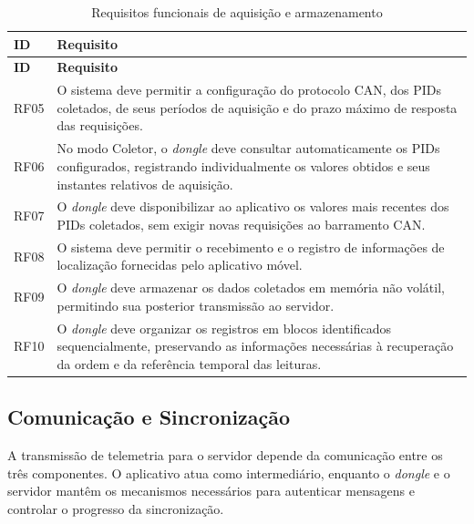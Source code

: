 \begin{longtable}{p{}p{}}
\caption{Requisitos funcionais de aquisição e armazenamento}
\label{tab:rf-coleta}\\
\hline
\textbf{ID} & \textbf{Requisito} \\
\hline
\endfirsthead

\hline
\textbf{ID} & \textbf{Requisito} \\
\hline
\endhead

RF05 & O sistema deve permitir a configuração do protocolo CAN,
dos PIDs coletados, de seus períodos de aquisição e do prazo
máximo de resposta das requisições. \\

RF06 & No modo Coletor, o \textit{dongle} deve consultar automaticamente
os PIDs configurados, registrando individualmente os valores
obtidos e seus instantes relativos de aquisição. \\

RF07 & O \textit{dongle} deve disponibilizar ao aplicativo os valores
mais recentes dos PIDs coletados, sem exigir novas requisições
ao barramento CAN. \\

RF08 & O sistema deve permitir o recebimento e o registro de
informações de localização fornecidas pelo aplicativo móvel. \\

RF09 & O \textit{dongle} deve armazenar os dados coletados em memória
não volátil, permitindo sua posterior transmissão ao servidor. \\

RF10 & O \textit{dongle} deve organizar os registros em blocos
identificados sequencialmente, preservando as informações
necessárias à recuperação da ordem e da referência temporal
das leituras. \\

\hline
\end{longtable}


\subsection{Comunicação e Sincronização}

A transmissão de telemetria para o servidor depende da comunicação entre os três componentes. O aplicativo atua como intermediário, enquanto o \textit{dongle} e o servidor mantêm os mecanismos necessários para autenticar mensagens e controlar o progresso da sincronização.


